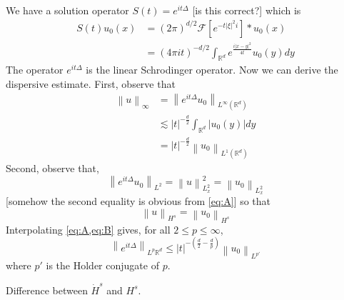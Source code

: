 \documentclass{article}
\def\purple{\color{Purple}}
\newcommand{\pnote}[1]{{\purple [#1]}} %
\def\R{\mathbb{R}} %
\newcommand\norm[1]{\left\lVert#1\right\rVert}
\begin{document}
We have a solution operator $S(t)=e^{it\Delta}$ \pnote{is this correct?} which is
\begin{align}\label{eq:7}
  S(t)u_{0}(x) 
  &= \left( 2\pi \right)^{d/2} \mathcal{F} \left[ e^{-t|\xi|^{2}i} \right]*u_{0}(x)\nonumber\\
  &= \left( 4\pi it \right)^{-d/2} \int_{\R^d}e^{\frac{i|x-y|^{2}}{4t}}u_{0}(y)dy 
\end{align}
The operator $e^{it\Delta}$ is the linear Schrodinger operator. Now we can
derive the dispersive estimate. First, observe that
\begin{align}\label{eq:A}
  \norm{u}_{\infty}
  &=\norm{e^{it\Delta}u_{0}}_{L^{\infty}(\R^d)}\nonumber\\
  &\lesssim |t|^{-\frac{d}{2}}\int_{\R^d}\left| u_{0}(y) \right| dy \nonumber\\
  &=\left| t \right|^{-\frac{d}{2}}\norm{u_{0}}_{L^{1}(\R^d)}
\end{align}
Second, observe that,
\begin{equation}\label{eq:B}
  \norm{e^{it\Delta}u_{0}}_{L^{2}}= \norm{u}_{L^{2}_{x}}^{2}= \norm{u_{0}}_{L^{2}_{x}}
\end{equation}
\pnote{somehow the second equality is obvious from \cref{eq:A}}
so that
\begin{equation*}
  \norm{u}_{H^{s}}=\norm{u_{0}}_{H^{s}} 
\end{equation*}
Interpolating \cref{eq:A,eq:B} gives, for all  $2 \leq p \leq \infty$, 
\begin{equation*}
  \norm{e^{it\Delta}}_{L^{p}\R^d}  \leq |t|^{-\left( \frac{d}{2}-\frac{d}{p} \right) }\norm{u_{0}}_{L^{p'}}
\end{equation*}
where $p'$ is the Holder conjugate of $p$.

Difference between $\dot{H}^{s}$  and $H^{s}$.
\end{document}
